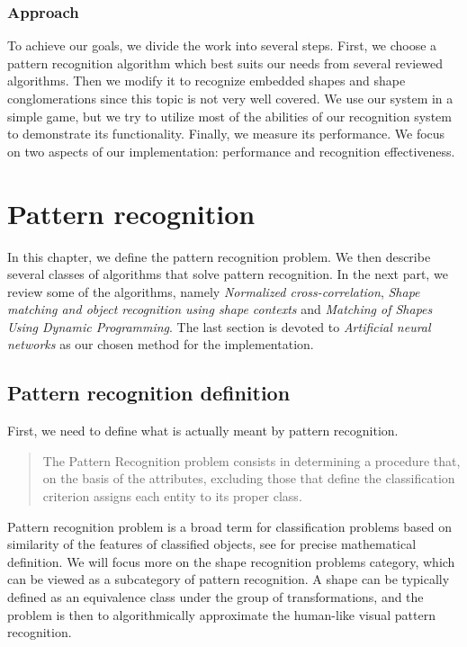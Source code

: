 \subsection{Approach} 
To achieve our goals, we divide the work into several steps. First, we choose a pattern recognition algorithm which best suits our needs from several reviewed algorithms. Then we modify it to recognize embedded shapes and shape conglomerations since this topic is not very well covered. We use our system in a simple game, but we try to utilize most of the abilities of our recognition system to demonstrate its functionality. Finally, we measure its performance. We focus on two aspects of our implementation: performance and recognition effectiveness.


\chapter{Pattern recognition}
In this chapter, we define the pattern recognition problem. We then describe several classes of algorithms that solve pattern recognition. In the next part, we review some of the algorithms, namely \emph{Normalized cross-correlation}, \emph{Shape matching and object recognition using shape contexts} and \emph{Matching of Shapes Using Dynamic Programming}. The last section is devoted to \emph{Artificial neural networks} as our chosen method for the implementation.

\section{Pattern recognition definition}
First, we need to define what is actually meant by pattern recognition. \begin{quotation}
The Pattern Recognition problem consists in determining a procedure that, on the basis of the attributes, excluding those that define the classification criterion assigns each entity to its proper class.
\end{quotation} \cite{formalMethods}
 Pattern recognition problem is a broad term for classification problems based on similarity of the features of classified objects, see \citet{formalMethods} for precise mathematical definition. We will focus more on the shape recognition problems category, which can be viewed as a subcategory of pattern recognition. A shape can be typically defined as an equivalence class under the group of transformations, and the problem is then to algorithmically approximate the human-like visual pattern recognition. 

